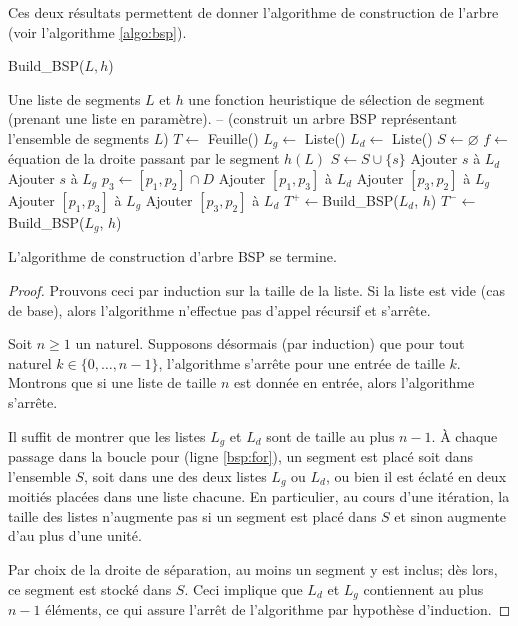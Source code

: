 Ces deux résultats permettent de donner l'algorithme de construction de
l'arbre (voir l'algorithme \ref{algo:bsp}).
\begin{algorithm}
  \caption{Build\_BSP($L, h$)}
  \begin{algorithmic}[1] \label{algo:bsp}
    \REQUIRE Une liste de segments $L$ et $h$ une fonction
    heuristique de sélection de segment (prenant une liste en paramètre).
    \ENSURE -- (construit un arbre BSP représentant l'ensemble de segments $L$)
    \STATE $T\leftarrow$ Feuille()
    \ENDIF
    \STATE $L_g\leftarrow$ Liste()
    \STATE $L_d\leftarrow$ Liste()
    \STATE $S \leftarrow \varnothing$
    \STATE $f\leftarrow$ équation de la droite passant par le segment $h(L)$
     \label{bsp:for}
    \STATE $S\leftarrow S\cup\{s\}$
    \STATE Ajouter $s$ à $L_d$
    \STATE Ajouter $s$ à $L_g$
    \ELSE
    \STATE $p_3\leftarrow [p_1, p_2]\cap D$
    \STATE Ajouter $[p_1, p_3]$ à $L_d$
    \STATE Ajouter $[p_3, p_2]$ à $L_g$
    \ELSE
    \STATE Ajouter $[p_1, p_3]$ à $L_g$
    \STATE Ajouter $[p_3, p_2]$ à $L_d$
    \ENDIF
    \ENDIF
    \ENDFOR
    \STATE $T^+\leftarrow$Build\_BSP($L_d$, $h$)
    \STATE $T^-\leftarrow$Build\_BSP($L_g$, $h$)
    \ENDIF
  \end{algorithmic}
\end{algorithm}

\begin{prop}
  L'algorithme de construction d'arbre BSP se termine.
\end{prop}
\begin{proof}
  Prouvons ceci par induction sur la taille de la liste.
  Si la liste est vide (cas de base), alors l'algorithme n'effectue
  pas d'appel récursif et s'arrête.

  Soit $n\geq 1$ un naturel. Supposons désormais (par induction) que pour
  tout naturel $k\in\{0, \ldots, n-1\}$, l'algorithme s'arrête pour
  une entrée de taille $k$. Montrons que si une liste de taille $n$
  est donnée en entrée, alors l'algorithme s'arrête.

  Il suffit de montrer que les listes $L_g$ et $L_d$ sont de taille
  au plus $n-1$. \`{A} chaque passage dans la boucle pour (ligne \ref{bsp:for}), un segment
  est placé soit dans l'ensemble $S$, soit dans une des deux listes
  $L_g$ ou $L_d$, ou bien il est éclaté en deux moitiés placées
  dans une liste chacune. En particulier, au cours d'une itération,
  la taille des listes n'augmente pas si un segment est placé dans $S$
  et sinon augmente d'au plus d'une unité.

  Par choix de la droite de séparation,
  au moins un segment y est inclus; dès lors, ce segment est stocké
  dans $S$. Ceci implique que $L_d$ et $L_g$ contiennent au plus $n-1$
  éléments, ce qui assure l'arrêt de l'algorithme par hypothèse d'induction.
\end{proof}


